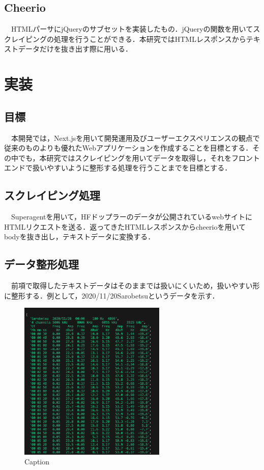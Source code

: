 \subsection{Cheerio}

　HTMLパーサにjQueryのサブセットを実装したもの．jQueryの関数を用いてスクレイピングの処理を行うことができる．本研究ではHTMLレスポンスからテキストデータだけを抜き出す際に用いる．\cite{cheerio}
\section{実装}
\subsection{目標}
　本開発では，Next.jsを用いて開発運用及びユーザーエクスペリエンスの観点で従来のものよりも優れたWebアプリケーションを作成することを目標とする．その中でも，本研究ではスクレイピングを用いてデータを取得し，それをフロントエンドで扱いやすいように整形する処理を行うことまでを目標とする．
\subsection{スクレイピング処理}
　Superagentを用いて，HFドップラーのデータが公開されているwebサイト\cite{hfd}にHTMLリクエストを送る．返ってきたHTMLレスポンスからcheerioを用いてbodyを抜き出し，テキストデータに変換する．
\subsection{データ整形処理}
　前項で取得したテキストデータはそのままでは扱いにくいため，扱いやすい形に整形する．例として，2020/11/20Sarobetsuというデータを示す．
 \begin{figure}[h]
   \centering
   \caption{Caption}
   \label{fig:my_label}
   \includegraphics[width=70mm]{fig/textdata.png}
 \end{figure}
